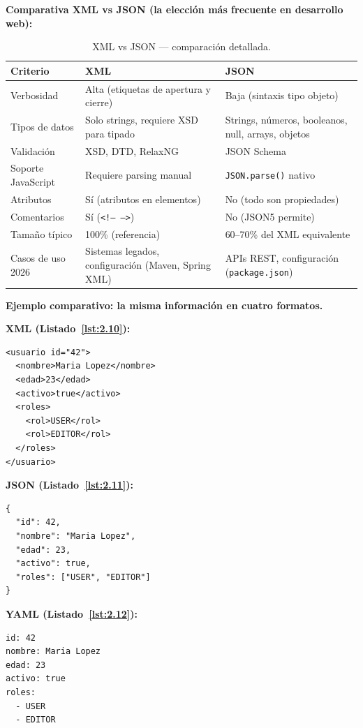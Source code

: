 \documentclass[11pt,a4paper,openany]{book}
\begin{document}
\textbf{Comparativa XML vs JSON (la elección más frecuente en
desarrollo web):}

\begin{table}[htbp]
\centering
\caption{XML vs JSON --- comparación detallada.}
\footnotesize
\begin{tabularx}{\textwidth}{lXX}
\toprule
\textbf{Criterio} & \textbf{XML} & \textbf{JSON}\\
\midrule
Verbosidad & Alta (etiquetas de apertura y cierre) & Baja (sintaxis tipo objeto)\\
Tipos de datos & Solo strings, requiere XSD para tipado & Strings, números, booleanos, null, arrays, objetos\\
Validación & XSD, DTD, RelaxNG & JSON Schema\\
Soporte JavaScript & Requiere parsing manual & \texttt{JSON.parse()} nativo\\
Atributos & Sí (atributos en elementos) & No (todo son propiedades)\\
Comentarios & Sí (\texttt{<!-- -->}) & No (JSON5 permite)\\
Tamaño típico & 100\% (referencia) & 60--70\% del XML equivalente\\
Casos de uso 2026 & Sistemas legados, configuración (Maven, Spring XML) & APIs REST, configuración (\texttt{package.json})\\
\bottomrule
\end{tabularx}
\end{table}

\textbf{Ejemplo comparativo: la misma información en cuatro formatos.}

\textbf{XML (Listado~\ref{lst:2.10}):}
\begin{lstlisting}[style=xml,numbers=none,caption={Ejemplo de XML},label=lst:2.10]
<usuario id="42">
  <nombre>Maria Lopez</nombre>
  <edad>23</edad>
  <activo>true</activo>
  <roles>
    <rol>USER</rol>
    <rol>EDITOR</rol>
  </roles>
</usuario>
\end{lstlisting}

\textbf{JSON (Listado~\ref{lst:2.11}):}
\begin{lstlisting}[style=js,numbers=none,caption={Ejemplo de JavaScript},label=lst:2.11]
{
  "id": 42,
  "nombre": "Maria Lopez",
  "edad": 23,
  "activo": true,
  "roles": ["USER", "EDITOR"]
}
\end{lstlisting}

\textbf{YAML (Listado~\ref{lst:2.12}):}
\begin{lstlisting}[numbers=none,basicstyle=\ttfamily\footnotesize,frame=single,caption={Ejemplo de Código},label=lst:2.12]
id: 42
nombre: Maria Lopez
edad: 23
activo: true
roles:
  - USER
  - EDITOR
\end{lstlisting}
\end{document}
